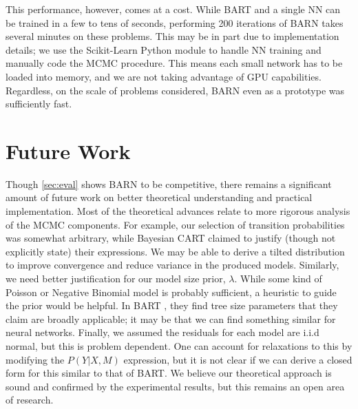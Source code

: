 \documentclass[12pt]{article}
\begin{document}
This performance, however, comes at a cost.  While BART and a single NN can be trained in a few to tens of seconds, performing 200 iterations of BARN takes several minutes on these problems.  This may be in part due to implementation details; we use the Scikit-Learn Python module to handle NN training \cite{scikit-learn} and manually code the MCMC procedure.  This means each small network has to be loaded into memory, and we are not taking advantage of GPU capabilities.  Regardless, on the scale of problems considered, BARN even as a prototype was sufficiently fast.

\section{Future Work}\label{sec:future}

Though \autoref{sec:eval} shows BARN to be competitive, there remains a significant amount of future work on better theoretical understanding and practical implementation.  Most of the theoretical advances relate to more rigorous analysis of the MCMC components.  For example, our selection of transition probabilities was somewhat arbitrary, while Bayesian CART \cite{chipman1998bayesian} claimed to justify (though not explicitly state) their expressions.  We may be able to derive a tilted distribution to improve convergence and reduce variance in the produced models.  Similarly, we need better justification for our model size prior, $\lambda$.  While some kind of Poisson or Negative Binomial model is probably sufficient, a heuristic to guide the prior would be helpful.  In BART \cite{chipman2010bart}, they find tree size parameters that they claim are broadly applicable; it may be that we can find something similar for neural networks.  Finally, we assumed the residuals for each model are i.i.d normal, but this is problem dependent.  One can account for relaxations to this by modifying the $P(Y|X,M)$ expression, but it is not clear if we can derive a closed form for this similar to that of BART.  We believe our theoretical approach is sound and confirmed by the experimental results, but this remains an open area of research.
\end{document}
